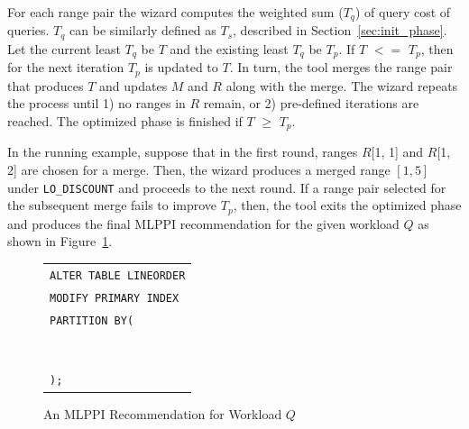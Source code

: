 \documentclass[runningheads]{comsis2}
\def\range#1{$[{#1}]$}
\begin{document}
For each range pair the wizard computes the weighted sum ($T_{q}$) of query cost of queries. 
$T_{q}$ can be similarly defined as $T_{s}$, described in Section~\ref{sec:init_phase}.
Let the current least $T_{q}$ be $T$ and the existing least $T_{q}$ be $T_{p}$. 
If $T$ $<=$ $T_{p}$, then for the next iteration $T_{p}$ is updated to $T$. 
In turn, the tool merges the range pair that produces $T$ and updates $M$ and $R$ along with the merge. 
The wizard repeats the process until 1) no ranges in $R$ remain, or 2) pre-defined iterations are reached. 
The optimized phase is finished if $T$ $\geq$ $T_{p}$.  

In the running example, suppose that in the first round, ranges $R$[1, 1] and $R$[1, 2] are chosen for a merge. 
Then, the wizard produces a merged range \range{1, 5} \hbox{under} {\tt LO\_DISCOUNT} and proceeds to the next round. 
If a range pair selected for the subsequent merge fails to improve $T_{p}$, 
then, the tool exits the optimized phase and \hbox{produces} the final MLPPI recommendation for the given workload $Q$ 
as shown in Figure~\ref{fig:mlppi}. 

\begin{figure}[h]
\begin{center}
\begin{tabular}{|l|} \hline
{\tt ALTER TABLE LINEORDER} \\
{\tt MODIFY PRIMARY INDEX} \\
{\tt PARTITION BY(} \\
\hspace{.1in}{\tt CASE\_N(} \\
	\hspace{.2in}{\tt LO\_DISCOUNT $\geq$ 1 AND LO\_DISCOUNT $\leq$ 5,} \\
	\hspace{.2in}{\tt LO\_DISCOUNT $\geq$ 7,} \\ 
	\hspace{.2in}{\tt NO CASE OR UNKNOWN),} \\
\hspace{.1in}{\tt CASE\_N(} \\
	\hspace{.2in}{\tt LO\_QUANTITY $<$ 25,} \\
	\hspace{.2in}{\tt LO\_QUANTITY $\geq$ 25 AND LO\_QUANTITY $\leq$ 35,} \\
	\hspace{.2in}{\tt NO CASE OR UNKNOWN)} \\ 
{\tt );} \\ \hline
\end{tabular}
\end{center}
\caption{An MLPPI Recommendation for Workload $Q$\label{fig:mlppi}}
\end{figure}
\end{document}
